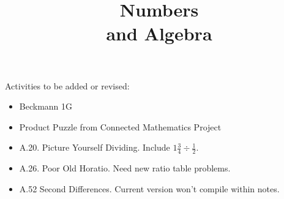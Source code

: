 \documentclass[justified,openany,nofonts]{tufte-book}
\title{Numbers \\ and Algebra}
\author{\teachingnotes}
\begin{document}
\def\document#1{} %
\maketitle


\vspace{1in}

\begin{teachingnote}
Activities to be added or revised:  
\begin{itemize}
\item Beckmann 1G
\item Product Puzzle from Connected Mathematics Project 
\item A.20. Picture Yourself Dividing.  Include $1\frac{3}{4 }\div \frac{1}{2}$. 
\item A.26. Poor Old Horatio.  Need new ratio table problems.
\item A.52  Second Differences.  Current version won't compile within notes.  
\end{itemize}
\end{teachingnote}

%
%
%
%
%


\newpage
\setcounter{secnumdepth}{2}%










\end{document}
